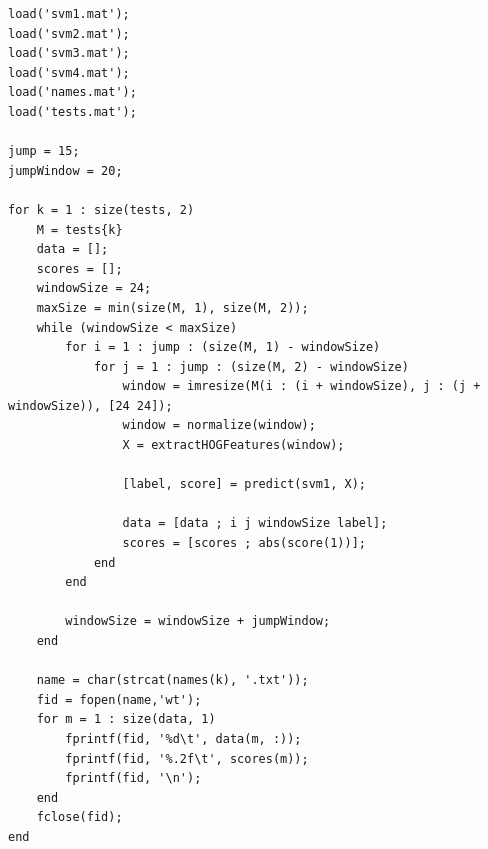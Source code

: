 \documentclass[11pt]{report}
\begin{document}
\begin{lstlisting}
load('svm1.mat');
load('svm2.mat');
load('svm3.mat');
load('svm4.mat');
load('names.mat');
load('tests.mat');

jump = 15;
jumpWindow = 20;

for k = 1 : size(tests, 2)
    M = tests{k}
    data = [];
    scores = [];
    windowSize = 24;
    maxSize = min(size(M, 1), size(M, 2));
    while (windowSize < maxSize)
        for i = 1 : jump : (size(M, 1) - windowSize)
            for j = 1 : jump : (size(M, 2) - windowSize)
                window = imresize(M(i : (i + windowSize), j : (j + windowSize)), [24 24]);
                window = normalize(window);
                X = extractHOGFeatures(window);

                [label, score] = predict(svm1, X);

                data = [data ; i j windowSize label]; 
                scores = [scores ; abs(score(1))];
            end
        end

        windowSize = windowSize + jumpWindow;
    end
    
    name = char(strcat(names(k), '.txt'));
    fid = fopen(name,'wt');
    for m = 1 : size(data, 1)
        fprintf(fid, '%d\t', data(m, :));
        fprintf(fid, '%.2f\t', scores(m));
        fprintf(fid, '\n');
    end
    fclose(fid);
end
\end{lstlisting}
\end{document}
